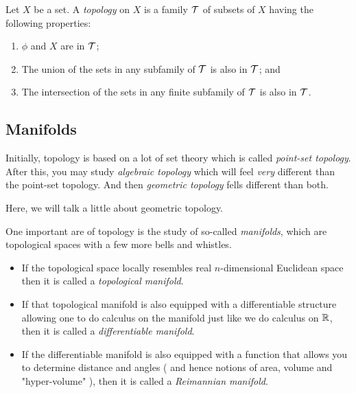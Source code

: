\begin{definition} 
	Let $X$ be a set. A \emph{topology} on $X$ is a family $\mathcal{T}$ of subsets of $X$ having the following properties:
	\begin{enumerate}
		\item $\phi$ and $X$ are in $\mathcal{T}$;

		\item The union of the sets in any subfamily of $\mathcal{T}$ is also in $\mathcal{T}$; and

		\item The intersection of the sets in any finite subfamily of $\mathcal{T}$ is also in $\mathcal{T}$.

	\end{enumerate}

\end{definition}


\subsection*{Manifolds}

Initially, topology is based on a lot of set theory which is called \emph{point-set topology}. After this, you may study \emph{algebraic topology} which will feel \emph{very} different than the point-set topology. And then \emph{geometric topology} fells different than both.

Here, we will talk a little about geometric topology.

One important are of topology is the study of so-called \emph{manifolds}, which are topological spaces with a few more bells and whistles.

\begin{itemize}
	\item If the topological space locally resembles real $n$-dimensional Euclidean space then it is called a \emph{topological manifold}.
	\item If that topological manifold is also equipped with a differentiable structure allowing one to do calculus on the manifold just like we do calculus on $\mathbb{R}$, then it is called a \emph{differentiable manifold}.
	\item If the differentiable manifold is also equipped with a function that allows you to determine distance and angles ( and hence notions of area, volume and "hyper-volume" ), then it is called a \emph{Reimannian manifold}.
\end{itemize}

